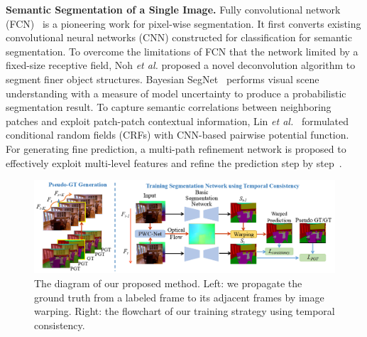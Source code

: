 \noindent \textbf{Semantic Segmentation of a Single Image.}
%
Fully convolutional network (FCN)~\cite{Long2015} is a pioneering work for pixel-wise segmentation. It first converts existing convolutional neural networks (CNN) constructed for classification for semantic segmentation.
%
To overcome the limitations of FCN that the network limited by a fixed-size receptive field, Noh \emph{et al.} \cite{Noh2015} proposed a novel deconvolution algorithm to segment finer object structures.
%
Bayesian SegNet~\cite{Kendall2015} performs visual scene understanding with a measure of model uncertainty to produce a probabilistic segmentation result.
%
To capture semantic correlations between neighboring patches and exploit patch-patch contextual information, Lin \emph{et al.}~\cite{Lin2016} formulated conditional random fields (CRFs) with CNN-based pairwise potential function. 
%
For generating fine prediction, a multi-path refinement network is proposed to effectively exploit multi-level features and refine the prediction step by step~\cite{Lin2017}.
%


\begin{figure}[htbp]
	\setlength{\abovecaptionskip}{0pt} 
	\setlength{\belowcaptionskip}{10pt}
	\centering
	\centering
	\includegraphics[scale=0.56]{figure/Pipeline.png}
	\caption{The diagram of our proposed method. Left: we propagate the ground truth from a labeled frame to its adjacent frames by image warping. Right: the flowchart of our training strategy using temporal consistency. 
		}
	\label{fig:Pipeline}
	\vspace*{-0.2cm}
\end{figure}
 

